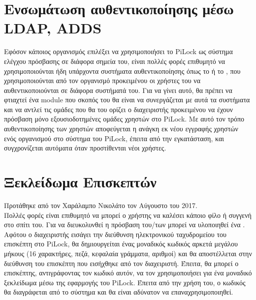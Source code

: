 \section{Ενσωμάτωση αυθεντικοποίησης μέσω LDAP, ADDS}
	Εφόσον κάποιος οργανισμός επιλέξει να χρησιμοποιήσει το PiLock ως σύστημα ελέγχου πρόσβασης σε διάφορα σημεία του, είναι πολλές φορές επιθυμητό να χρησιμοποιούνται ήδη υπάρχοντα συστήματα αυθεντικοποίησης όπως το  ή το , που χρησιμοποιούνται από τον οργανισμό προκειμένου οι χρήστες του να αυθεντικοποιούνται σε διάφορα συστήματά του. Για να γίνει αυτό, θα πρέπει να φτιαχτεί ένα module που σκοπός του θα είναι να συνεργάζεται με αυτά τα συστήματα και να αντλεί τις ομάδες που θα του ορίζει ο διαχειριστής προκειμένου να έχουν πρόσβαση μόνο εξουσιοδοτημένες ομάδες χρηστών στο PiLock. Με αυτό τον τρόπο αυθεντικοποίησης των χρηστών αποφεύγεται η ανάγκη εκ νέου εγγραφής χρηστών ενός οργανισμού στο σύστημα του PiLock, έπειτα από την εγκατάσταση, και συγχρονίζεται αυτόματα όταν προστίθενται νέοι χρήστες.

\section{Ξεκλείδωμα Επισκεπτών}
	Προτάθηκε από τον Χαράλαμπο Νικολάτο τον Αύγουστο του 2017.\\Πολλές φορές είναι επιθυμητό να μπορεί ο χρήστης να καλέσει κάποιο φίλο ή συγγενή στο σπίτι του. Για να διευκολυνθεί η πρόσβαση του/των μπορεί να υλοποιηθεί ένα . Αφότου ο διαχειριστής εισάγει την διεύθυνση ηλεκτρονικού ταχυδρομείου του επισκέπτη στο PiLock, θα δημιουργείται ένας μοναδικός κωδικός αρκετά μεγάλου μήκους (16 χαρακτήρες, πεζά, κεφαλαία γράμματα, αριθμοί) και θα αποστέλλεται στην διεύθυνση του επισκέπτη που εισήχθηκε από τον διαχειριστή. Έπειτα, θα μπορεί ο επισκέπτης, αντιγράφοντας τον κωδικό αυτόν, να τον χρησιμοποιήσει για ένα μοναδικό ξεκλείδωμα μέσω της εφαρμογής του PiLock. Έπειτα από την χρήση του, ο κωδικός θα διαγράφεται από το σύστημα και θα είναι αδύνατον να επαναχρησιμοποιηθεί.
